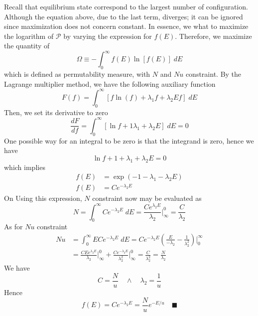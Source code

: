 \documentclass[../../../Main.tex]{subfiles}
\begin{document}
Recall that equilibrium state correspond to the largest number of configuration. Although the equation above, due to the last term, diverges; it can be ignored since maximization does not concern constant. In essence, we what to maximize the logarithm of $\mathcal{P}$ by varying the expression for $f(E)$. Therefore, we maximize the quantity of 
\begin{equation*}
    \Omega\equiv-\int_{0}^{\infty}f(E)\ln [f(E)]\;dE
\end{equation*}
which is defined as permutability measure, with $N$ and $Nu$ constraint. By the Lagrange multiplier method, we have the following auxiliary function
\begin{equation*}
    F(f)=\int_{0}^{\infty}[f\ln (f)+\lambda_1f+\lambda_2Ef]\;dE
\end{equation*}
Then, we set its derivative to zero
\begin{equation*}
    \frac{dF}{df}=\int_{0}^{\infty}[\ln f+1\lambda_1+\lambda_2E]\;dE=0
\end{equation*}
One possible way for an integral to be zero is that the integrand is zero, hence we have 
\begin{equation*}
    \ln f+1+\lambda_1+\lambda_2E=0
\end{equation*}
which implies
\begin{align*}
    f(E)&=\exp (-1-\lambda_1-\lambda_2E)\\
    f(E)&=Ce^{-\lambda_2E}
\end{align*}
On Using this expression, $N$ constraint now may be evaluated as 
\begin{equation*}
    N=\int_{0}^{\infty}Ce^{-\lambda_2E}\;dE=\frac{Ce^{\lambda_2E}}{\lambda_2}\bigg|_{\infty}^{0}=\frac{C}{\lambda_2}
\end{equation*}
As for $Nu$ constraint
\begin{align*}
    Nu&=\int_{0}^{\infty}ECe^{-\lambda_2E}\;dE= Ce^{-\lambda_2E}\left( \frac{E}{-\lambda_2}-\frac{1}{\lambda_2^2}\right) \bigg|_{0}^{\infty} \\
    &= \frac{CEe^{\lambda_2E}}{\lambda_2}\bigg|_{\infty}^{0} + \frac{Ce^{-\lambda_2E}}{\lambda_2^2}\bigg|_{\infty}^{0}=\frac{C}{\lambda_2^2}=\frac{N}{\lambda_2}
\end{align*}
We have
\begin{equation*}
    C=\frac{N}{u}\quad\land\quad\lambda_2=\frac{1}{u}
\end{equation*}
Hence
\begin{equation*}
    f(E)=Ce^{-\lambda_2E}=\frac{N}{u}e^{-E/u}\quad\blacksquare
\end{equation*}
\end{document}
